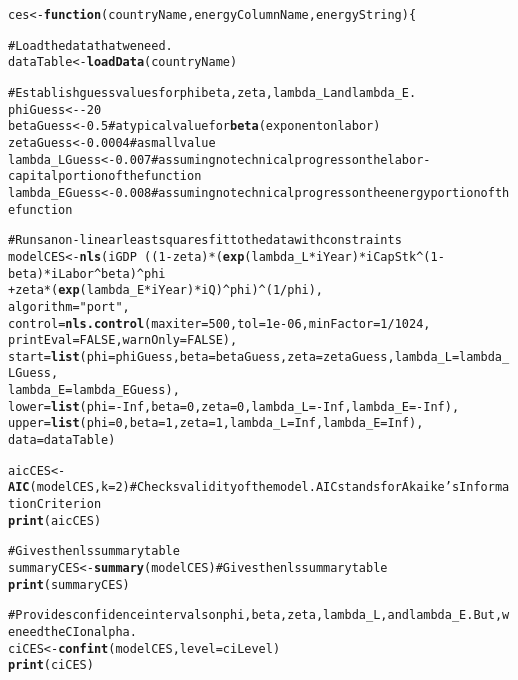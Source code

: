 \documentclass[preprint,authoryear,12pt]{elsarticle}\usepackage{graphicx, color}
\makeatletter
\newcommand{\hlfunctioncall}[1]{\textcolor[rgb]{0.501960784313725,0,0.329411764705882}{\textbf{#1}}}%
\newcommand{\hlstring}[1]{\textcolor[rgb]{0.6,0.6,1}{#1}}%
\newcommand{\hlcomment}[1]{\textcolor[rgb]{0.180392156862745,0.6,0.341176470588235}{#1}}%
\newenvironment{kframe}{%
 \def\at@end@of@kframe{}%
 \ifinner\ifhmode%
  \def\at@end@of@kframe{\end{minipage}}%
  \begin{minipage}{\columnwidth}%
 \fi\fi%
 \def\FrameCommand##1{\hskip\@totalleftmargin \hskip-\fboxsep
 \colorbox{shadecolor}{##1}\hskip-\fboxsep
     \hskip-\linewidth \hskip-\@totalleftmargin \hskip\columnwidth}%
 \MakeFramed {\advance\hsize-\width
   \@totalleftmargin\z@ \linewidth\hsize
   \@setminipage}}%
 {\par\unskip\endMakeFramed%
 \at@end@of@kframe}
\newenvironment{knitrout}{}{} %
\makeatother
\begin{document}
\begin{knitrout}
\color{fgcolor}\begin{kframe}
\begin{alltt}

ces <- \hlfunctioncall{function}(countryName, energyColumnName, energyString)\{
  
\hlcomment{  # Load the data that we need.}
  dataTable <- \hlfunctioncall{loadData}(countryName)
    
\hlcomment{  # Establish guess values for phi beta, zeta, lambda_L and lambda_E.}
  phiGuess <- -20
  betaGuess <- 0.5 \hlcomment{# a typical value for \hlfunctioncall{beta} (exponent on labor)}
  zetaGuess <- 0.0004 \hlcomment{# a small value}
  lambda_LGuess <- 0.007 \hlcomment{#assuming no technical progress on the labor-capital portion of the function}
  lambda_EGuess <- 0.008 \hlcomment{#assuming no technical progress on the energy portion of the function}
  
\hlcomment{  # Runs a non-linear least squares fit to the data with constraints}
  modelCES <- \hlfunctioncall{nls}(iGDP ~ ((1-zeta) * (\hlfunctioncall{exp}(lambda_L*iYear) * iCapStk^(1-beta) * iLabor^beta)^phi 
                           + zeta*(\hlfunctioncall{exp}(lambda_E*iYear) * iQ)^phi)^(1/phi), 
                   algorithm = \hlstring{"port"},
                   control = \hlfunctioncall{nls.control}(maxiter = 500, tol = 1e-06, minFactor = 1/1024, 
                                         printEval = FALSE, warnOnly = FALSE),
                   start = \hlfunctioncall{list}(phi=phiGuess, beta=betaGuess, zeta=zetaGuess, lambda_L=lambda_LGuess, 
                                lambda_E=lambda_EGuess),
                   lower = \hlfunctioncall{list}(phi=-Inf, beta=0, zeta=0, lambda_L=-Inf, lambda_E=-Inf),
                   upper = \hlfunctioncall{list}(phi=0, beta=1, zeta=1, lambda_L=Inf, lambda_E=Inf),
                   data=dataTable)

  aicCES <- \hlfunctioncall{AIC}(modelCES, k=2) \hlcomment{# Checks validity of the model. AIC stands for Akaike's Information Criterion}
  \hlfunctioncall{print}(aicCES)

\hlcomment{  # Gives the nls summary table}
  summaryCES <- \hlfunctioncall{summary}(modelCES) \hlcomment{# Gives the nls summary table}
  \hlfunctioncall{print}(summaryCES)
  
\hlcomment{  # Provides confidence intervals on phi, beta, zeta, lambda_L, and lambda_E. But, we need the CI on alpha.}
  ciCES <- \hlfunctioncall{confint}(modelCES, level = ciLevel)
  \hlfunctioncall{print}(ciCES)
  

\end{alltt}
\end{kframe}
\end{knitrout}
\end{document}
